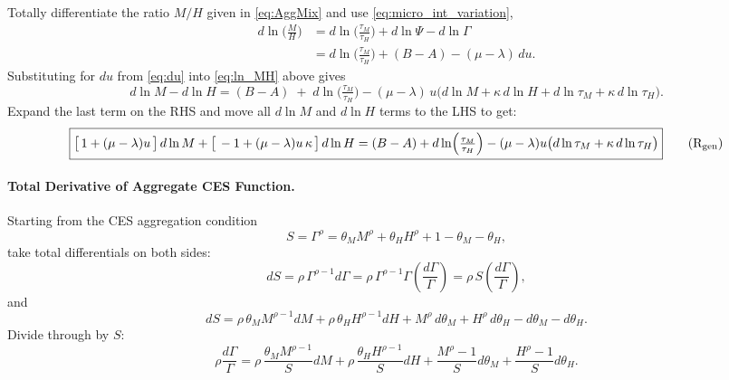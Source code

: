 \documentclass[english]{article}
\begin{document}
Totally differentiate the ratio $M/H$ given in \eqref{eq:AggMix} and use \eqref{eq:micro_int_variation},
\begin{align}
d\ln\!\Big(\frac{M}{H}\Big)
&= d\ln\!\Big(\frac{\tau_M}{\tau_H}\Big) + d\ln\Psi - d\ln\Gamma  \nonumber
\\ 
&= d\ln\!\Big(\frac{\tau_M}{\tau_H}\Big)
+ (B-A) - (\mu-\lambda)\,du.\label{eq:ln_MH}
\end{align}
Substituting for $du$ from \eqref{eq:du} into \eqref{eq:ln_MH} above gives
\[
d\ln M - d\ln H
= (B-A) \;+\; d\ln\!\Big(\tfrac{\tau_M}{\tau_H}\Big) - (\mu-\lambda)\, u\Big(d\ln M + \kappa\,d\ln H + d\ln \tau_M + \kappa\,d\ln \tau_H\Big).
\]
Expand the last term on the RHS and move all $d\ln M$ and $d\ln H$ terms to the LHS to get:
\begin{equation}
\boxed{
\big[\,1 + (\mu-\lambda)u\,\big]\,d\ln M
+ \big[\, -1 + (\mu-\lambda)u\,\kappa\,\big]\,d\ln H
=
(B-A) + d\ln\!\Big(\tfrac{\tau_M}{\tau_H}\Big)
 - (\mu-\lambda)u\big(d\ln \tau_M + \kappa\,d\ln \tau_H\big)
}
\tag{$\mathrm{R}_{\mathrm{gen}}$}\label{eq:Rgen}
\end{equation}







\paragraph{Total Derivative of Aggregate CES Function.}
Starting from the CES aggregation condition
\[
S = \Gamma^\rho = \theta_M M^\rho + \theta_H H^\rho + 1 - \theta_M - \theta_H,
\]
take total differentials on both sides:
\[
dS
= \rho\,\Gamma^{\rho-1} d\Gamma
= \rho\,\Gamma^{\rho-1} \Gamma \left( \frac{d\Gamma}{\Gamma} \right)
= \rho\,S \left( \frac{d\Gamma}{\Gamma} \right),
\]
and
\[
dS
= \rho\,\theta_M M^{\rho-1} dM + \rho\,\theta_H H^{\rho-1} dH
+ M^\rho\,d\theta_M + H^\rho\,d\theta_H - d\theta_M - d\theta_H.
\]
Divide through by \(S\):
\[
\rho \frac{d\Gamma}{\Gamma}
= \rho\,\frac{\theta_M M^{\rho-1}}{S} dM + \rho\,\frac{\theta_H H^{\rho-1}}{S} dH
+ \frac{M^\rho - 1}{S} d\theta_M + \frac{H^\rho - 1}{S} d\theta_H.
\]
\end{document}
